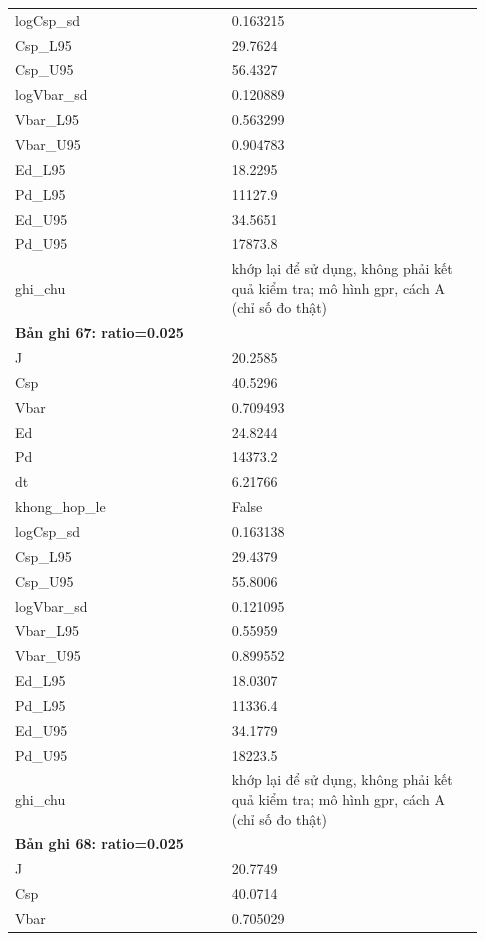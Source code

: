 \begin{longtable}{p{0.43\linewidth}p{0.50\linewidth}}
logCsp\_\allowbreak sd & 0.163215 \\
Csp\_\allowbreak L95 & 29.7624 \\
Csp\_\allowbreak U95 & 56.4327 \\
logVbar\_\allowbreak sd & 0.120889 \\
Vbar\_\allowbreak L95 & 0.563299 \\
Vbar\_\allowbreak U95 & 0.904783 \\
Ed\_\allowbreak L95 & 18.2295 \\
Pd\_\allowbreak L95 & 11127.9 \\
Ed\_\allowbreak U95 & 34.5651 \\
Pd\_\allowbreak U95 & 17873.8 \\
ghi\_\allowbreak chu & khớp lại để sử dụng, không phải kết quả kiểm tra; mô hình gpr, cách A (chỉ số đo thật) \\
\midrule
\multicolumn{2}{p{0.95\linewidth}}{\textbf{Bản ghi 67: ratio=0.025}} \\
J & 20.2585 \\
Csp & 40.5296 \\
Vbar & 0.709493 \\
Ed & 24.8244 \\
Pd & 14373.2 \\
dt & 6.21766 \\
khong\_\allowbreak hop\_\allowbreak le & False \\
logCsp\_\allowbreak sd & 0.163138 \\
Csp\_\allowbreak L95 & 29.4379 \\
Csp\_\allowbreak U95 & 55.8006 \\
logVbar\_\allowbreak sd & 0.121095 \\
Vbar\_\allowbreak L95 & 0.55959 \\
Vbar\_\allowbreak U95 & 0.899552 \\
Ed\_\allowbreak L95 & 18.0307 \\
Pd\_\allowbreak L95 & 11336.4 \\
Ed\_\allowbreak U95 & 34.1779 \\
Pd\_\allowbreak U95 & 18223.5 \\
ghi\_\allowbreak chu & khớp lại để sử dụng, không phải kết quả kiểm tra; mô hình gpr, cách A (chỉ số đo thật) \\
\midrule
\multicolumn{2}{p{0.95\linewidth}}{\textbf{Bản ghi 68: ratio=0.025}} \\
J & 20.7749 \\
Csp & 40.0714 \\
Vbar & 0.705029 \\

\end{longtable}

